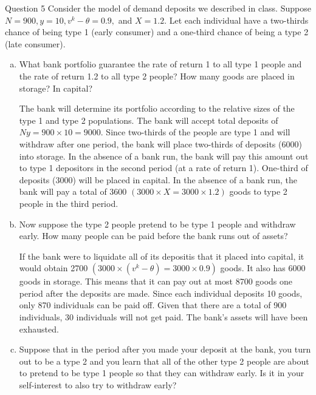 \documentclass[a4paper]{article}
\newif\IfInSansMode
\numberwithin{equation}{section}
\numberwithin{figure}{section}
\begin{document}
	\begin{questionbox}{Question 5}
		Consider the model of demand deposits we described in class. Suppose \( N = 900, y = 10, v^k-\theta = 0.9, \) and \( X = 1.2 \). Let each individual have a two-thirds chance of being type 1 (early consumer) and a one-third chance of being a type 2 (late consumer).
		\begin{enumerate}[(a)]
			\item What bank portfolio guarantee the rate of return 1 to all type 1 people and the rate of return 1.2 to all type 2 people? How many goods are placed in storage? In capital?
			\begin{explanationbox}
				The bank will determine its portfolio according to the relative sizes of the type 1 and type 2 populations. The bank will accept total deposits of \( Ny = 900\times10 = 9000 \). Since two-thirds of the people are type 1 and will withdraw after one period, the bank will place two-thirds of deposits (6000) into storage. In the absence of a bank run, the bank will pay this amount out to type 1 depositors in the second period (at a rate of return 1). One-third of deposits (3000) will be placed in capital. In the absence of a bank run, the bank will pay a total of 3600 \( (3000 \times X = 3000 \times 1.2) \) goods to type 2 people in the third period.
			\end{explanationbox}
			\item Now suppose the type 2 people pretend to be type 1 people and withdraw early. How many people can be paid before the bank runs out of assets?
			\begin{explanationbox}
				If the bank were to liquidate all of its depositis that it placed into capital, it would obtain 2700 \( (3000 \times (v^k - \theta) = 3000 \times 0.9) \) goods. It also has 6000 goods in storage. This means that it can pay out at most 8700 goods one period after the deposits are made. Since each individual deposits 10 goods, only 870 individuals can be paid off. Given that there are a total of 900 individuals, 30 individuals will not get paid. The bank's assets will have been exhausted. 
			\end{explanationbox}
			\item Suppose that in the period after you made your deposit at the bank, you turn out to be a type 2 and you learn that all of the other type 2 people are about to pretend to be type 1 people so that they can withdraw early. Is it in your self-interest to also try to withdraw early?
			\begin{explanationbox}

\end{explanationbox}
\end{enumerate}
\end{questionbox}
\end{document}
